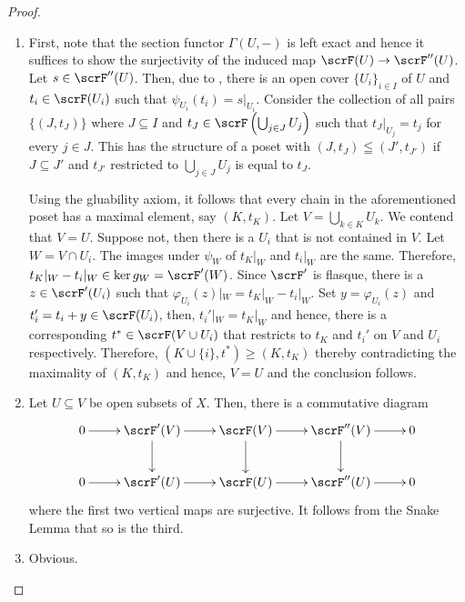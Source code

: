 \begin{proof}
\begin{enumerate}[label=(\alph*)]
    \item First, note that the section functor $\Gamma(U, -)$ is left exact and hence it suffices to show the surjectivity of the induced map $\scrF(U)\to\scrF''(U)$. Let $s\in\scrF''(U)$. Then, due to , there is an open cover $\{U_i\}_{i\in I}$ of $U$ and $t_i\in\scrF(U_i)$ such that $\psi_{U_i}(t_i) = s|_{U_i}$. Consider the collection of all pairs $\{(J, t_J)\}$ where $J\subseteq I$ and $t_J\in\scrF\left(\bigcup_{j\in J}U_j\right)$ such that $t_J|_{U_j} = t_j$ for every $j\in J$. This has the structure of a poset with $(J, t_J)\leqq(J', t_{J'})$ if $J\subseteq J'$ and $t_{J'}$ restricted to $\bigcup_{j\in J}U_j$ is equal to $t_J$.

    Using the gluability axiom, it follows that every chain in the aforementioned poset has a maximal element, say $(K, t_K)$. Let $V = \bigcup_{k\in K} U_k$. We contend that $V = U$. Suppose not, then there is a $U_i$ that is not contained in $V$. Let $W = V\cap U_i$. The images under $\psi_{W}$ of $t_K|_{W}$ and $t_i|_W$ are the same. Therefore, $t_K|_W - t_i|_W\in\ker g_W = \scrF'(W)$. Since $\scrF'$ is flasque, there is a $z\in\scrF'(U_i)$ such that $\varphi_{U_i}(z)|_W = t_K|_W - t_i|_W$. Set $y = \varphi_{U_i}(z)$ and $t_i' = t_i + y\in\scrF(U_i)$, then, $t_i'|_W = t_K|_W$ and hence, there is a corresponding $t^\ast\in\scrF(V\cup U_i)$ that restricts to $t_K$ and $t_i'$ on $V$ and $U_i$ respectively. Therefore, $(K\cup\{i\}, t^\ast)\ge(K, t_K)$ thereby contradicting the maximality of $(K, t_K)$ and hence, $V = U$ and the conclusion follows.

    \item Let $U\subseteq V$ be open subsets of $X$. Then, there is a commutative diagram 
    \begin{equation*}
        \xymatrix{
            0\ar[r] & \scrF'(V)\ar[r]\ar[d] & \scrF(V)\ar[r]\ar[d] & \scrF''(V)\ar[r]\ar[d] & 0\\
            0\ar[r] & \scrF'(U)\ar[r] & \scrF(U)\ar[r] & \scrF''(U)\ar[r] & 0
        }
    \end{equation*}
    where the first two vertical maps are surjective. It follows from the Snake Lemma that so is the third.

    \item Obvious.\qedhere
\end{enumerate}
\end{proof}


